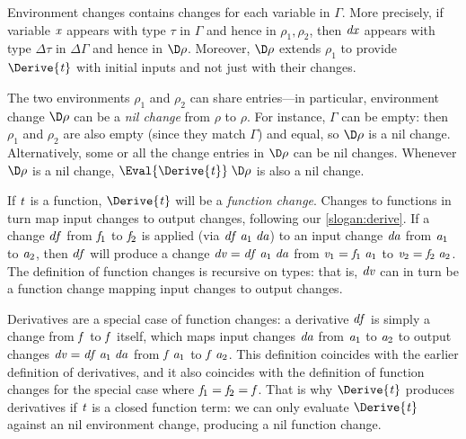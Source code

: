 Environment changes contains changes for each variable in \ensuremath{\Gamma}. More precisely, if
variable \ensuremath{\Varid{x}} appears with type \ensuremath{\tau} in \ensuremath{\Gamma} and hence in \ensuremath{\rho_{1},\rho_{2}}, then
\ensuremath{\Varid{dx}} appears with type \ensuremath{\Delta \tau} in \ensuremath{\Delta \Gamma} and hence in \ensuremath{\D\rho}. Moreover,
\ensuremath{\D\rho} extends \ensuremath{\rho_{1}} to provide \ensuremath{\Derive{\Varid{t}}} with initial inputs and not just
with their changes.

The two environments
\ensuremath{\rho_{1}} and \ensuremath{\rho_{2}} can share entries---in particular, environment change \ensuremath{\D\rho} can
be a \emph{nil change} from \ensuremath{\rho} to \ensuremath{\rho}. For instance, \ensuremath{\Gamma} can be empty:
then \ensuremath{\rho_{1}} and \ensuremath{\rho_{2}} are also empty (since they match \ensuremath{\Gamma}) and equal, so
\ensuremath{\D\rho} is a nil change. Alternatively, some or all the change entries in \ensuremath{\D\rho}
can be nil changes. Whenever \ensuremath{\D\rho} is a nil change, \ensuremath{\Eval{\Derive{\Varid{t}}}\;\D\rho} is
also a nil change.

If \ensuremath{\Varid{t}} is a function, \ensuremath{\Derive{\Varid{t}}} will be a \emph{function change}.
Changes to functions in turn map input changes to output changes, following our
\cref{slogan:derive}. If a change \ensuremath{\Varid{df}} from \ensuremath{\Varid{f}_{1}} to \ensuremath{\Varid{f}_{2}} is applied (via \ensuremath{\Varid{df}\;\Varid{a}_{1}\;\Varid{da}}) to an input change \ensuremath{\Varid{da}} from \ensuremath{\Varid{a}_{1}} to \ensuremath{\Varid{a}_{2}}, then \ensuremath{\Varid{df}} will produce a change
\ensuremath{\Varid{dv}\mathrel{=}\Varid{df}\;\Varid{a}_{1}\;\Varid{da}} from \ensuremath{\Varid{v}_{1}\mathrel{=}\Varid{f}_{1}\;\Varid{a}_{1}} to \ensuremath{\Varid{v}_{2}\mathrel{=}\Varid{f}_{2}\;\Varid{a}_{2}}. The definition of function
changes is recursive on types: that is, \ensuremath{\Varid{dv}} can in turn be a function change
mapping input changes to output changes.

Derivatives are a special case of function changes: a derivative \ensuremath{\Varid{df}} is simply
a change from \ensuremath{\Varid{f}} to \ensuremath{\Varid{f}} itself, which maps input changes \ensuremath{\Varid{da}} from \ensuremath{\Varid{a}_{1}} to \ensuremath{\Varid{a}_{2}}
to output changes \ensuremath{\Varid{dv}\mathrel{=}\Varid{df}\;\Varid{a}_{1}\;\Varid{da}} from \ensuremath{\Varid{f}\;\Varid{a}_{1}} to \ensuremath{\Varid{f}\;\Varid{a}_{2}}. This definition
coincides with the earlier definition of derivatives, and it also
coincides with the definition of function changes for the special case where \ensuremath{\Varid{f}_{1}\mathrel{=}\Varid{f}_{2}\mathrel{=}\Varid{f}}. That is why \ensuremath{\Derive{\Varid{t}}} produces derivatives if \ensuremath{\Varid{t}} is a closed
function term: we can only evaluate \ensuremath{\Derive{\Varid{t}}} against an nil environment
change, producing a nil function change.

